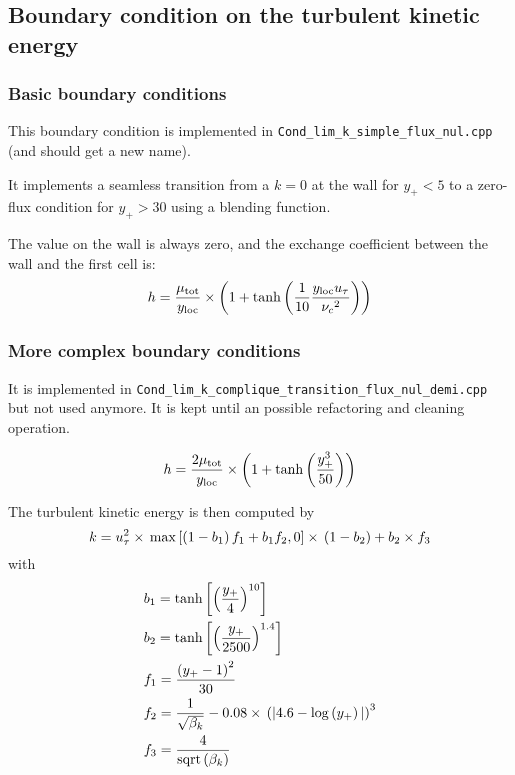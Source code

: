 \subsection{Boundary condition on the turbulent kinetic energy}

\subsubsection{Basic boundary conditions}

This boundary condition is implemented in \texttt{Cond\_lim\_k\_simple\_flux\_nul.cpp} (and should get a new name).

It implements a seamless transition from a $k=0$ at the wall for $y_+<5$ to a zero-flux condition for $y_+>30$ using a blending function.

The value on the wall is always zero, and the exchange coefficient between the wall and the first cell is:
\begin{equation}
    h = \frac{\mu_\text{tot}}{y_\text{loc}} \times \left( 1 + \text{tanh}\left( \frac{1}{10}\frac{y_\text{loc}u_{\tau}}{{{\nu_c}}^2} \right) \right)
    \label{eq_k_blending}
\end{equation}

\subsubsection{More complex boundary conditions}
It is implemented in \texttt{Cond\_lim\_k\_complique\_transition\_flux\_nul\_demi.cpp} but not used anymore. It is kept until an possible refactoring and cleaning operation.

\begin{equation}
    h = \frac{2\mu_\text{tot}}{y_\text{loc}} \times \left( 1 + \text{tanh}\left( \frac{y_+^3}{50} \right) \right)
\end{equation}

The turbulent kinetic energy is then computed by
\begin{equation}
    k = u_{\tau}^2\times{}\max\left[ \left( 1-b_1 \right) f_1 + b_1f_2, 0 \right] \times{} \left( 1 - b_2 \right) + b_2\times{}f_3
\end{equation}
with
\begin{align}
    &b_1 = \text{tanh}\left[ \left( \frac{y_+}{4} \right)^{10} \right]\\
    &b_2 = \text{tanh}\left[ \left( \frac{y_+}{2500} \right)^{1.4} \right]\\
    &f_1 = \frac{\left( y_+ - 1 \right)^2}{30}\\
    &f_2 = \frac{1}{\sqrt{\beta_k}} - 0.08\times{}\left( \vert 4.6-\log\left( y_+ \right) \vert \right)^3\\
    &f_3 = \frac{4}{\text{sqrt}\left( \beta_k \right)}
\end{align}

